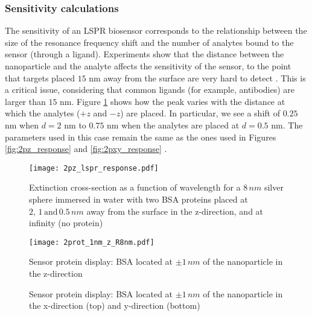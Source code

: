\subsubsection{Sensitivity calculations} \label{sec:bsa_sensitivity}

The sensitivity of an LSPR biosensor corresponds to the relationship between the size 
of the resonance frequency shift and the number of analytes bound to the sensor (through a ligand).
Experiments show that the distance between the nanoparticle and the analyte 
affects the sensitivity of the sensor, to the point that
targets placed $15$ nm away from the surface are very hard to detect \cite{HaesETal2004}.
This is a critical issue, considering that common ligands (for example, antibodies) are
larger than $15$ nm. Figure \ref{fig:dist_response} 
shows how the peak varies with the distance at which the analytes ($+z$ and $-z$) are placed.  
In particular, we see a shift of $0.25$ nm when $d=2$ nm to $0.75$ nm when the 
analytes are placed at $d=0.5$ nm. The parameters used in this case remain 
the same as the ones used in Figures \ref{fig:2pz_response} and \ref{fig:2pxy_response} .


\begin{figure}[h] %
   \centering
   \texttt{[image: 2pz\_lspr\_response.pdf]} 
   \caption{Extinction cross-section as a function of wavelength for a $8 \, nm$
            silver sphere immersed in water with two BSA proteins placed at
            $2, \, 1 \, \text{and} \, 0.5 \, nm$ away from the surface in the 
            z-direction, and at infinity (no protein)}
   \label{fig:dist_response}
\end{figure}

\begin{figure*}[] %
   \centering
   \texttt{[image: 2prot\_1nm\_z\_R8nm.pdf]} 
   \caption{Sensor protein display: BSA located at $\pm 1 \, nm$ of the 
            nanoparticle in the z-direction}
   \label{fig:display_z}
\end{figure*}

\begin{figure*}[]

   \centering
    \vfill
    \caption{Sensor protein display: BSA located at $\pm 1 \, nm$ of the nanoparticle in the
            x-direction (top) and y-direction (bottom)}
    \label{fig:display_xy}
\end{figure*}

